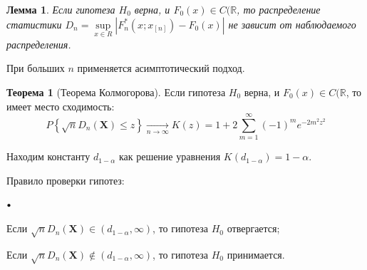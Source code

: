 \documentclass[oneside,final,14pt]{extreport}
\theoremstyle{plain}
\newtheorem*{lem}{Лемма}
\theoremstyle{definition}
\theoremstyle{named}
\newtheorem*{namedthm}{Теорема}
\newcommand\sbullet[1][.5]{\mathbin{\vcenter{\hbox{\scalebox{#1}{$\bullet$}}}}}
\newenvironment{compactlist}{
\begin{list}{{$\sbullet[.75]$}}{
\setlength\partopsep{0pt}
\setlength\parskip{0pt}
\setlength\parsep{0pt}
\setlength\topsep{0pt}
\setlength\itemsep{0pt}
}
}{
\end{list}
}
\begin{document}
\begin{lem}
Если гипотеза $H_0$ верна, и $F_{0}(x) \in C(\mathbb{R}$, то распределение статистики $D_{n}=\sup\limits_{x \in R}\left|F_{n}^{*}\left(x ; x_{[n]}\right)-F_{0}(x)\right|$ не зависит от наблюдаемого распределения.
\end{lem}

При больших $n$ применяется асимптотический подход.
\begin{namedthm}[Теорема Колмогорова]
Если гипотеза $H_0$ верна, и $F_{0}(x) \in C(\mathbb{R}$, то имеет место сходимость:
\begin{equation*}
    P\left\{\sqrt{n} D_{n}\left(\mathbf{X}\right) \leqslant z\right\} \underset{n \rightarrow \infty}{\longrightarrow} K(z)=1+2 \sum\limits_{m=1}^{\infty}(-1)^{m} e^{-2 m^{2} z^{2}}
\end{equation*}
\end{namedthm}

Находим константу $d_{1-\alpha}$ как решение уравнения $K\left(d_{1-\alpha}\right)=1-\alpha$.

Правило проверки гипотез:
\begin{compactlist}
    \item Если $\sqrt{n} D_{n}\left(\mathbf{X}\right) \in\left(d_{1-\alpha}, \infty\right)$, то гипотеза $H_0$ отвергается;
    \item Если $\sqrt{n} D_{n}\left(\mathbf{X}\right) \notin\left(d_{1-\alpha}, \infty\right)$, то гипотеза $H_0$ принимается.
\end{compactlist}
\end{document}
